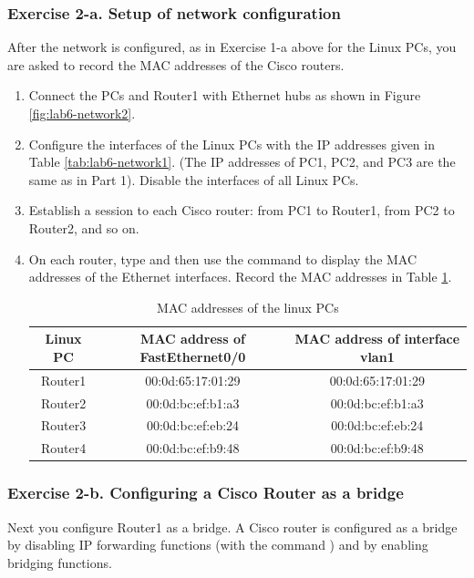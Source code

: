 \subsubsection{Exercise 2-a. Setup of network configuration}
After the network is configured, as in Exercise 1-a above for the Linux PCs, you are asked to record the MAC addresses of the Cisco routers.
\begin{enumerate}
	\item Connect the PCs and Router1 with Ethernet hubs as shown in Figure \ref{fig:lab6-network2}.
	\item Configure the  interfaces of the Linux PCs with the IP addresses given in Table \ref{tab:lab6-network1}. (The IP addresses of PC1, PC2, and PC3 are the same as in Part 1). Disable the  interfaces of all Linux PCs.
	\item Establish a  session to each Cisco router: from PC1 to Router1, from PC2 to Router2, and so on.
	\item On each router, type  and then use the command  to display the MAC addresses of the Ethernet interfaces. Record the MAC addresses in Table \ref{tab:lab6-macs-routers}.
		\begin{table}[h!t]
			\centering
			\begin{tabular}{| c | c | c |}	
				\hline
				\textbf{Linux PC} & \textbf{MAC address of FastEthernet0/0} & \textbf{MAC address of interface vlan1} \\ \hline
				Router1 & 00:0d:65:17:01:29 & 00:0d:65:17:01:29 \\ 
				Router2 & 00:0d:bc:ef:b1:a3 & 00:0d:bc:ef:b1:a3 \\
				Router3 & 00:0d:bc:ef:eb:24 & 00:0d:bc:ef:eb:24 \\
				Router4 & 00:0d:bc:ef:b9:48 & 00:0d:bc:ef:b9:48 \\ \hline
			\end{tabular}
			\caption{MAC addresses of the linux PCs}
			\label{tab:lab6-macs-routers}
		\end{table}
\end{enumerate}

\subsubsection{Exercise 2-b. Configuring a Cisco Router as a bridge}

Next you configure Router1 as a bridge. A Cisco router is configured as a bridge by disabling IP forwarding functions (with the command ) and by enabling bridging functions.

